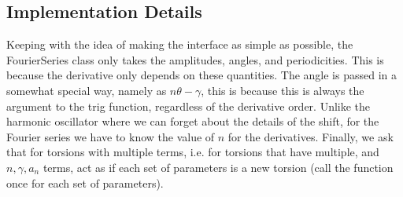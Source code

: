 \subsection*{Implementation Details}

Keeping with the idea of making the interface as simple as possible, the Fourier\+Series class only takes the amplitudes, angles, and periodicities. This is because the derivative only depends on these quantities. The angle is passed in a somewhat special way, namely as $n\theta-\gamma$, this is because this is always the argument to the trig function, regardless of the derivative order. Unlike the harmonic oscillator where we can forget about the details of the shift, for the Fourier series we have to know the value of $n$ for the derivatives. Finally, we ask that for torsions with multiple terms, i.\+e. for torsions that have multiple, and $n,\gamma,a_n$ terms, act as if each set of parameters is a new torsion (call the function once for each set of parameters). 